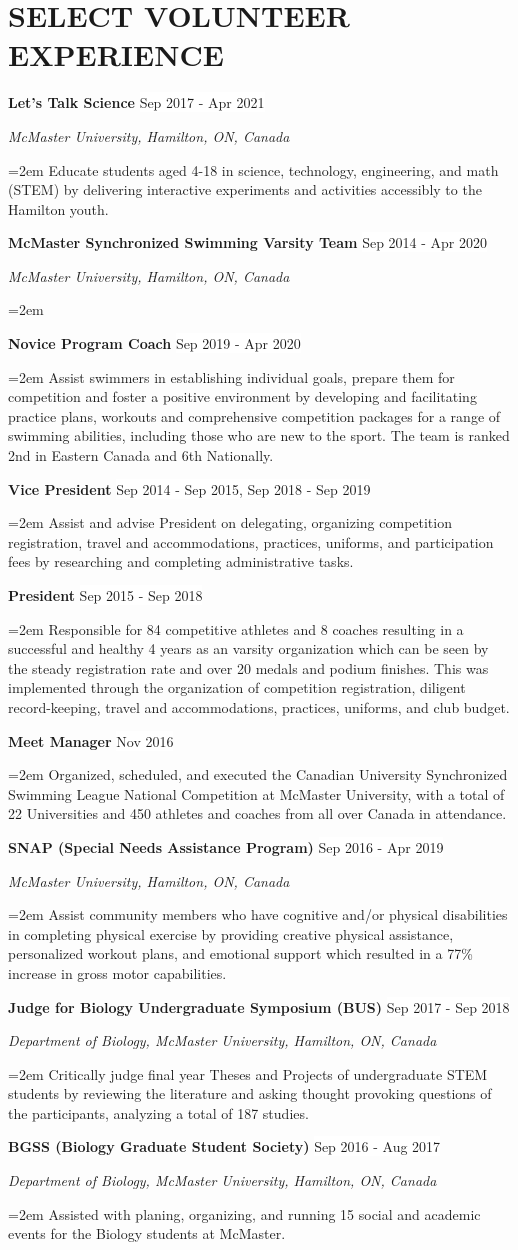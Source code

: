 \documentclass[paper=a4,fontsize=11pt]{scrartcl}	 			%
\newcommand{\NewPart}[1]{\section*{\uppercase{#1}}}
\newcommand{\EducationEntry}[4]{
		\noindent \textbf{#1} \hfill 					%
		\colorbox{White}{%
			\parbox{10em}{%
			\hfill\color{Black}#2}} \par				%
		\noindent \textit{#3} \par					%
		\noindent\hangindent=2em\hangafter=0 \small #4 	%
		\normalsize \par}
\newcommand{\WorkEntry}[4]{						%
		\noindent \textbf{#1} \hfill 					%
		\colorbox{White}{\color{Black}#2} \par		%
		\noindent \textit{#3} \par					%
		\noindent\hangindent=2em\hangafter=0 \small #4 	%
		\normalsize \par}
\newcommand{\WorkEntryB}[3]{						%
	\noindent \textbf{#1} \hfill 					%
	\colorbox{White}{\color{Black}#2} \par		%
	\noindent \textit{#3} \par					%
	\noindent\hangindent=2em\hangafter=0 \small  	%
	\normalsize \par}
\newcommand{\WorkEntryD}[3]{						%
	\indent \indent \textbf{#1} \hfill 					%
	\colorbox{White}{\color{Black}#2} \par		%
	\hangindent=2em\hangafter=0 \small  #3 \par
    \normalsize }
\begin{document}
\NewPart{Select Volunteer Experience}{}
\WorkEntry{Let's Talk Science}{Sep 2017 - Apr 2021}{McMaster University, Hamilton, ON, Canada}{Educate students aged 4-18 in science, technology, engineering, and math (STEM) by delivering interactive experiments and activities accessibly to the Hamilton youth.}
\WorkEntryB{McMaster Synchronized Swimming Varsity Team}{Sep 2014 - Apr 2020}{McMaster University, Hamilton, ON, Canada}
\WorkEntryD{Novice Program Coach}{Sep 2019 - Apr 2020}{
	\noindent Assist swimmers in establishing individual goals, prepare them for competition and foster a positive environment by developing and facilitating practice plans, workouts and comprehensive competition packages for a range of swimming abilities, including those who are new to the sport. The team is ranked 2nd in Eastern Canada and 6th Nationally.}
\WorkEntryD{Vice President}{Sep 2014 - Sep 2015, Sep 2018 - Sep 2019}{
	\noindent Assist and advise President on delegating, organizing competition registration, travel and accommodations, practices, uniforms, and participation fees by researching and completing administrative tasks.}
\WorkEntryD{President}{Sep 2015 - Sep 2018}{
	\noindent Responsible for 84 competitive athletes and 8 coaches resulting in a successful and healthy 4 years as an varsity organization which can be seen by the steady registration rate and over 20 medals and podium finishes. This was implemented through the organization of competition registration, diligent record-keeping, travel and accommodations, practices, uniforms, and club budget.}
\WorkEntryD{Meet Manager}{Nov 2016}{
	\noindent Organized, scheduled, and executed the Canadian University Synchronized Swimming League National Competition at McMaster University, with a total of 22 Universities and 450 athletes and coaches from all over Canada in attendance.}
\WorkEntry{SNAP (Special Needs Assistance Program)}{Sep 2016 - Apr 2019}{McMaster University, Hamilton, ON, Canada}{Assist community members who have cognitive and/or physical disabilities in completing physical exercise by providing creative physical assistance, personalized workout plans, and emotional support which resulted in a 77\% increase in gross motor capabilities.}
\WorkEntry{Judge for Biology Undergraduate Symposium (BUS)}{Sep 2017 - Sep 2018}{Department of Biology, McMaster University, Hamilton, ON, Canada}{Critically judge final year Theses and Projects of undergraduate STEM students by reviewing the literature and asking thought provoking questions of the participants, analyzing a total of 187 studies.}
\WorkEntry{BGSS (Biology Graduate Student Society)}{Sep 2016 - Aug 2017}{Department of Biology, McMaster University, Hamilton, ON, Canada}{Assisted with planing, organizing, and running 15 social and academic events for the Biology students at McMaster.}
\end{document}
